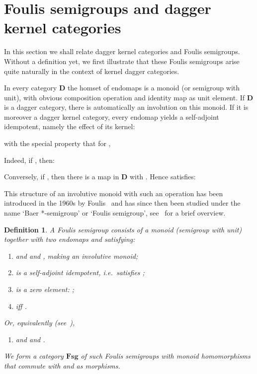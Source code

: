 \documentclass{article}
\newtheorem{definition}[theorem]{Definition}
\newcommand{\Cat}[1]{\ensuremath{\mathbf{#1}}}
\begin{document}
\section{Foulis semigroups and dagger kernel categories}\label{FoulisDagKerSec}

In this section we shall relate dagger kernel categories and Foulis
semigroups. Without a definition yet, we first illustrate that these
Foulis semigroups arise quite naturally in the context of kernel
dagger categories.

In every category \Cat{D} the homset  of
endomaps  is a monoid (or semigroup with
unit), with obvious composition operation  and identity map
 as unit element. If \Cat{D} is a dagger category, there is
automatically an involution  on this monoid. If it is
moreover a dagger kernel category, every endomap 
yields a self-adjoint idempotent, namely the effect of its kernel:


\noindent with the special property that for ,


\noindent Indeed, if , then:


\noindent Conversely, if , then there is a map
 in \Cat{D} with . Hence  satisfies:


This structure of an involutive monoid  with such an operation  has been introduced in the 1960s by
Foulis~\cite{Foulis60,Foulis62,Foulis63} and has since then been
studied under the name `Baer *-semigroup' or `Foulis semigroup',
see~\cite[Chapter~5, \S\S18]{Kalmbach83} for a brief overview.




\begin{definition}
\label{FoulisDef}
A Foulis semigroup consists of a monoid (semigroup with unit)  together with two endomaps 
and  satisfying:
\begin{enumerate}
\item  and 
  and , making  an involutive monoid;

\item  is a self-adjoint idempotent, \textit{i.e.}~satisfies
  ;

\item  is a zero
element: ;

\item  iff .

\end{enumerate}

\noindent Or, equivalently (see~\cite[Chapter~5, \S\S18,
Lemma~1]{Kalmbach83}),
\begin{enumerate}
\item[4.]  and  and 
.
\end{enumerate}

We form a category \Cat{Fsg} of such Foulis semigroups with monoid
homomorphisms that commute with  and  as morphisms.
\end{definition}
\end{document}
